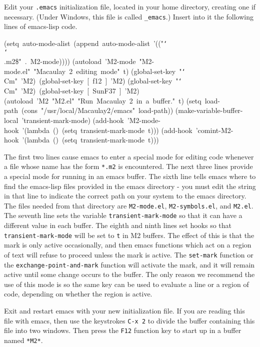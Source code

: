 Edit your {\tt {}.emacs} initialization file, located in your home directory,
creating one if necessary.  (Under Windows, this file is called {\tt {}\_emacs}.)
Insert into it the following lines of emacs-lisp code.

\medskip

{\scriptsize\ttfamily\obeylines
(setq~auto-mode-alist~(append~auto-mode-alist~'(("{\tt\char`\\}{\tt\char`\\}.m2\$"~.~M2-mode))))
(autoload~'M2-mode~"M2-mode.el"~"Macaulay~2~editing~mode"~t)
(global-set-key~"{\tt\char`\\}{}Cm"~'M2)~(global-set-key~[~f12~]~'M2)
(global-set-key~"{\tt\char`\\}{}Cm"~'M2)~(global-set-key~[~SunF37~]~'M2)
(autoload~'M2~"M2.el"~"Run~Macaulay~2~in~a~buffer."~t)
(setq~load-path~(cons~"/usr/local/Macaulay2/emacs"~load-path))
(make-variable-buffer-local~'transient-mark-mode)
(add-hook~'M2-mode-hook~'(lambda~()~(setq~transient-mark-mode~t)))
(add-hook~'comint-M2-hook~'(lambda~()~(setq~transient-mark-mode~t)))
}

\smallskip

The first two lines cause emacs to enter a special mode for editing \Mtwo
code whenever a file whose name has the form {\tt {}*.m2} is encountered.  
The next three lines provide a special mode for running \Mtwo in an emacs buffer.
The sixth line tells emacs where to find the emacs-lisp files provided in the
\Mtwo emacs directory - you must edit the string in that line to
indicate the correct path on your system to the \Mtwo emacs directory.
The files needed from that directory are {\tt {}M2-mode.el},
{\tt {}M2-symbols.el}, and {\tt {}M2.el}.  The seventh line sets
the variable {\tt {}transient-mark-mode} so that it can
have a different value in each buffer.  The eighth and ninth lines set
hooks so that {\tt {}transient-mark-mode} will be set to {\tt {}t} 
in M2 buffers.  The effect of this is that the mark is only active occasionally,
and then emacs functions which act on a region of text will refuse to proceed 
unless the mark is active.  The {\tt {}set-mark} function or the
{\tt {}exchange-point-and-mark} function will activate the mark, and it
will remain active until some change occurs to the buffer.  The only reason
we recommend the use of this mode is so the same key can be used to evaluate 
a line or a region of code, depending on whether the region is active.

Exit and restart emacs with your new initialization file.  
If you are reading this file with emacs, then use the keystrokes
{\tt {}C-x\ 2} to divide the buffer containing this file into two windows.
Then press the {\tt {}F12} function key to start up 
\Mtwo in a buffer named {\tt {}*M2*}.

